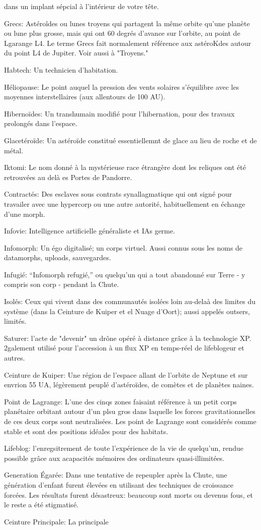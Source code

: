 dans un implant sépcial à l'intérieur de votre tête. \item Grecs: Astéroîdes ou lunes troyens qui partagent la même orbite qu'une planète ou lune plus grosse, mais qui ont 60 degrés d'avance sur l'orbite, au point de Lgarange L4. Le terme Grecs fait normalement référence aux astéroKdes autour du point L4 de Jupiter. Voir aussi à "Troyens." \item Habtech: Un technicien d'habitation. \item Héliopause: Le point auquel la pression des vents solaires s'équilibre avec les moyennes interstellaires (aux allentours de 100 AU). \item Hibernoïdes: Un transhumain modifié pour l'hibernation, pour des travaux prolongés dans l'espace. \item Glacetéroïde: Un astéroïde constitué essentiellemnt de glace au lieu de roche et de métal. \item Iktomi: Le nom donné à la mystérieuse race étrangère dont les reliques ont été retrouvées au delà es Portes de Pandorre. \item Contractés: Des esclaves sous contrats synallagmatique qui ont signé pour travailer avec une hypercorp ou une autre autorité, habituellement en échange d'une morph. \item Infovie: Intelligence artificielle généraliste et IAs germe. \item Infomorph: Un égo digitalisé; un corps virtuel. Aussi connus sous les noms de datamorphs, uploads, sauvegardes. \item Infugié: ``Infomorph refugié,'' ou quelqu'un qui a tout abandonné sur Terre - y compris son corp - pendant la Chute. \item Isolés: Ceux qui vivent dans des communautés isolées loin au-delaà des limites du système (dans la Ceinture de Kuiper et el Nuage d'Oort); aussi appelés outsers, limités. \item Saturer: l'acte de "devenir" un drône opéré à distance grâce à la technologie XP. 2galement utilisé pour l'accession à un flux XP en temps-réel de lifeblogeur et autres. \item Ceinture de Kuiper: Une région de l'espace allant de l'orbite de Neptune et sur envrion 55 UA, légèrement peuplé d'astéroïdes, de comètes et de planètes naines. \item Point de Lagrange: L'une des cinqs zones faisaint référence à un petit corps planétaire orbitant autour d'un plsu gros dans laquelle les forces gravitationnelles de ces deux corps sont neutralisées. Les point de Lagrange sont considérés comme stable et sont des positions idéales pour des habitats. \item Lifeblog: l'enregsitrement de toute l'expérience de la vie de quelqu'un, rendue possible grâce aux acapacités mémoires des ordinateurs quasi-illimitées. \item Generation Égarée: Dans une tentative de repeupler après la Chute, une génération d'enfant furent élevées en utilisant des techniques de croissance forcées. Les résultats furent désastreux: beaucoup sont morts ou devenus fous, et le reste a été stigmatisé. \item Ceinture Principale: La principale 